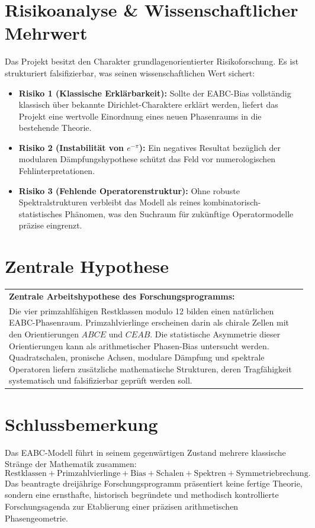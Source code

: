 \documentclass[11pt,a4paper,bibliography=totoc]{scrartcl}
\begin{document}
\section{Risikoanalyse \& Wissenschaftlicher Mehrwert}
Das Projekt besitzt den Charakter grundlagenorientierter Risikoforschung. Es ist strukturiert falsifizierbar, was seinen wissenschaftlichen Wert sichert:
\begin{itemize}
    \item \textbf{Risiko 1 (Klassische Erklärbarkeit):} Sollte der EABC-Bias vollständig klassisch über bekannte Dirichlet-Charaktere erklärt werden, liefert das Projekt eine wertvolle Einordnung eines neuen Phasenraums in die bestehende Theorie.
    \item \textbf{Risiko 2 (Instabilität von $e^{-\pi}$):} Ein negatives Resultat bezüglich der modularen Dämpfungshypothese schützt das Feld vor numerologischen Fehlinterpretationen.
    \item \textbf{Risiko 3 (Fehlende Operatorenstruktur):} Ohne robuste Spektralstrukturen verbleibt das Modell als reines kombinatorisch-statistisches Phänomen, was den Suchraum für zukünftige Operatormodelle präzise eingrenzt.
\end{itemize}

\section{Zentrale Hypothese}

\begin{center}
\renewcommand{\arraystretch}{1.5}
\begin{tabular}{|p{}|}
\hline
\textbf{Zentrale Arbeitshypothese des Forschungsprogramms:} \\
Die vier primzahlfähigen Restklassen modulo 12 bilden einen natürlichen EABC-Phasenraum. Primzahlvierlinge erscheinen darin als chirale Zellen mit den Orientierungen $ABCE$ und $CEAB$. Die statistische Asymmetrie dieser Orientierungen kann als arithmetischer Phasen-Bias untersucht werden. Quadratschalen, pronische Achsen, modulare Dämpfung und spektrale Operatoren liefern zusätzliche mathematische Strukturen, deren Tragfähigkeit systematisch und falsifizierbar geprüft werden soll. \\
\hline
\end{tabular}
\end{center}

\section{Schlussbemerkung}
Das EABC-Modell führt in seinem gegenwärtigen Zustand mehrere klassische Stränge der Mathematik zusammen:
\[
\text{Restklassen} + \text{Primzahlvierlinge} + \text{Bias} + \text{Schalen} + \text{Spektren} + \text{Symmetriebrechung}.
\]
Das beantragte dreijährige Forschungsprogramm präsentiert keine fertige Theorie, sondern eine ernsthafte, historisch begründete und methodisch kontrollierte Forschungsagenda zur Etablierung einer präzisen arithmetischen Phasengeometrie.
\end{document}
